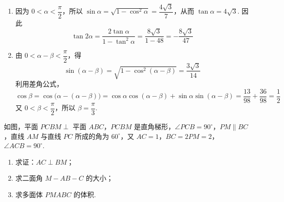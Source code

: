 \begin{solution}
\begin{enumerate}
\item 因为 \(0<\alpha<\dfrac\pi2\)，所以 \(\sin\alpha=\sqrt{1-\cos^2\alpha}=\dfrac{4\sqrt3}{7}\)，从而 \(\tan\alpha=4\sqrt3\). 因此
\[
\tan2\alpha=\frac{2\tan\alpha}{1-\tan^2\alpha}
 =\frac{8\sqrt3}{1-48}=-\frac{8\sqrt3}{47}
\]
\item 由 \(0<\alpha-\beta<\dfrac\pi2\)，得
\[
\sin(\alpha-\beta)=\sqrt{1-\cos^2(\alpha-\beta)}=\frac{3\sqrt3}{14}
\]
利用差角公式，
\[
\cos\beta=\cos\bigl(\alpha-(\alpha-\beta)\bigr)
 =\cos\alpha\cos(\alpha-\beta)+\sin\alpha\sin(\alpha-\beta)
 =\frac{13}{98}+\frac{36}{98}=\frac12
\]
又 \(0<\beta<\dfrac\pi2\)，所以 \(\beta=\dfrac\pi3\).
\end{enumerate}
\end{solution}

\begin{problem}
如图，平面 \(PCBM\perp\) 平面 \(ABC\)，\(PCBM\) 是直角梯形，\(\angle PCB = 90^{\circ}\)，\(PM \parallel BC\)，直线 \(AM\) 与直线 \(PC\) 所成的角为 \(60^{\circ}\)，又 \(AC = 1\)，\(BC = 2PM = 2\)，\(\angle ACB = 90^{\circ}\).
\begin{enumerate}
\item 求证：\( AC \perp BM \)；
\item 求二面角 \(M - AB - C\) 的大小；
\item 求多面体 \(PMABC\) 的体积.
\end{enumerate}

\end{problem}

